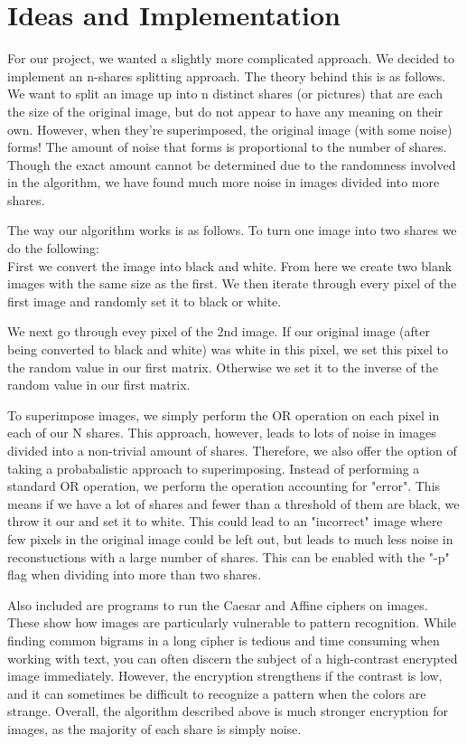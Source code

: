 \documentclass{article}
\begin{document}
\section*{Ideas and Implementation}
For our project, we wanted a slightly more complicated approach.  We decided to implement an n-shares splitting approach.  The theory behind this is as follows.  We want to split an image up into n distinct shares (or pictures) that are each the size of the original image, but do not appear to have any meaning on their own.  However, when they're superimposed, the original image (with some noise) forms!  The amount of noise that forms is proportional to the number of shares.  Though the exact amount cannot be determined due to the randomness involved in the algorithm, we have found much more noise in images divided into more shares.  
\\\par
The way our algorithm works is as follows.  To turn one image into two shares we do the following:
\\
First we convert the image into black and white.  From here we create two blank images with the same size as the first.  We then iterate through every pixel of the first image and randomly set it to black or white.  \\
\par We next go through evey pixel of the 2nd image.  If our original image (after being converted to black and white) was white in this pixel, we set this pixel to the random value in our first matrix.  Otherwise we set it to the inverse of the random value in our first matrix.
\\ \par
To superimpose images, we simply perform the OR operation on each pixel in each of our N shares.  This approach, however, leads to lots of noise in images divided into a non-trivial amount of shares.  Therefore, we also offer the option of taking a probabalistic approach to superimposing.  Instead of performing a standard OR operation, we perform the operation accounting for "error".  This means if we have a lot of shares and fewer than a threshold of them are black, we throw it our and set it to white.  This could lead to an "incorrect" image where few pixels in the original image could be left out, but leads to much less noise in reconstuctions with a large number of shares.  This can be enabled with the "-p" flag when dividing into more than two shares.
\\ \par
Also included are programs to run the Caesar and Affine ciphers on images.  These show how images are particularly vulnerable to pattern recognition.  While finding common bigrams in a long cipher is tedious and time consuming when working with text, you can often discern the subject of a high-contrast encrypted image immediately.  However, the encryption strengthens if the contrast is low, and it can sometimes be difficult to recognize a pattern when the colors are strange.  Overall, the algorithm described above is much stronger encryption for images, as the majority of each share is simply noise.
\end{document}
